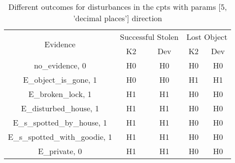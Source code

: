 \begin{table}\begin{tabular}{c|cc|cc}\toprule\multirow{2}{*}{Evidence} & \multicolumn{2}{c}{Successful Stolen} & \multicolumn{2}{c}{Lost Object} \\& {K2} & {Dev} & {K2} & {Dev} \\\midrule
no\_evidence, 0 & H0&H0&H0&H0\\E\_object\_is\_gone, 1 & H0&H0&H1&H1\\E\_broken\_lock, 1 & H1&H1&H0&H0\\E\_disturbed\_house, 1 & H1&H1&H0&H0\\E\_s\_spotted\_by\_house, 1 & H1&H1&H0&H0\\E\_s\_spotted\_with\_goodie, 1 & H1&H1&H0&H0\\E\_private, 0 & H1&H1&H0&H0\\\bottomrule\end{tabular}\caption{Different outcomes for disturbances in the cpts with params [5, 'decimal places'] direction}\end{table}